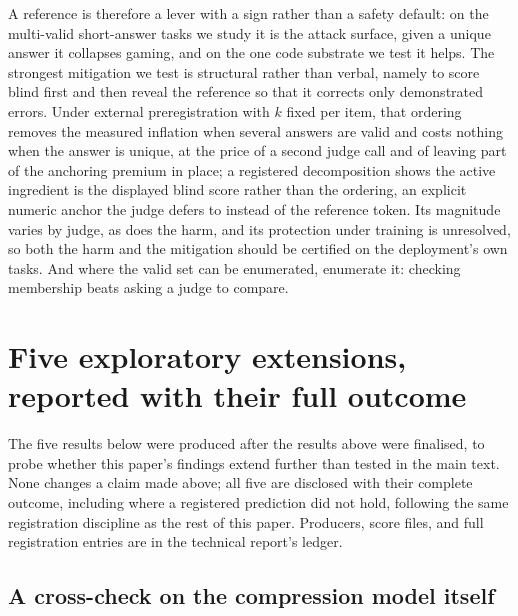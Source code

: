 \documentclass[11pt]{article}
\begin{document}
A reference is therefore a lever with a sign rather than a safety default: on the multi-valid short-answer tasks we study it is the attack surface, given a unique answer it collapses gaming, and on the one code substrate we test it helps.
The strongest mitigation we test is structural rather than verbal, namely to score blind first and then reveal the reference so that it corrects only demonstrated errors.
Under external preregistration with $k$ fixed per item, that ordering removes the measured inflation when several answers are valid and costs nothing when the answer is unique, at the price of a second judge call and of leaving part of the anchoring premium in place; a registered decomposition shows the active ingredient is the displayed blind score rather than the ordering, an explicit numeric anchor the judge defers to instead of the reference token.
Its magnitude varies by judge, as does the harm, and its protection under training is unresolved, so both the harm and the mitigation should be certified on the deployment's own tasks.
And where the valid set can be enumerated, enumerate it: checking membership beats asking a judge to compare.

\appendix
\section{Five exploratory extensions, reported with their full outcome}
\label{sec:appendix-extensions}

The five results below were produced after the results above were finalised, to probe whether this paper's findings extend further than tested in the main text. None changes a claim made above; all five are disclosed with their complete outcome, including where a registered prediction did not hold, following the same registration discipline as the rest of this paper. Producers, score files, and full registration entries are in the technical report's ledger.

\subsection{A cross-check on the compression model itself}
\label{sec:appendix-compression}
\end{document}
